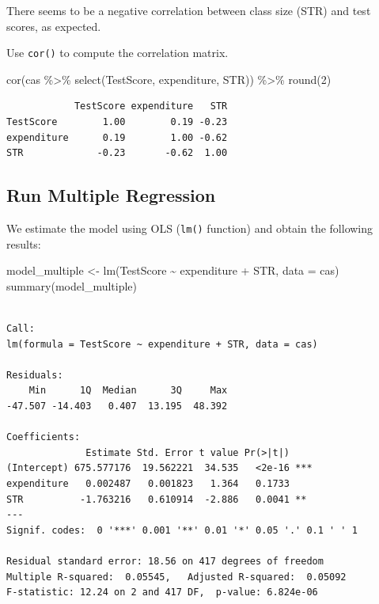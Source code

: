 \documentclass[
  12pt,
  letterpaper,
]{scrbook}
\newenvironment{Shaded}{\begin{snugshade}}{\end{snugshade}}
\newcommand{\AttributeTok}[1]{\textcolor[rgb]{0.40,0.45,0.13}{#1}}
\newcommand{\DecValTok}[1]{\textcolor[rgb]{0.68,0.00,0.00}{#1}}
\newcommand{\FunctionTok}[1]{\textcolor[rgb]{0.28,0.35,0.67}{#1}}
\newcommand{\NormalTok}[1]{\textcolor[rgb]{0.00,0.23,0.31}{#1}}
\newcommand{\OtherTok}[1]{\textcolor[rgb]{0.00,0.23,0.31}{#1}}
\newcommand{\SpecialCharTok}[1]{\textcolor[rgb]{0.37,0.37,0.37}{#1}}
\theoremstyle{definition}
\theoremstyle{plain}
\theoremstyle{remark}
\begin{document}
There seems to be a negative correlation between class size (STR) and
test scores, as expected.

Use \texttt{cor()} to compute the correlation matrix.

\begin{Shaded}
\begin{Highlighting}[]
\FunctionTok{cor}\NormalTok{(cas }\SpecialCharTok{\%\textgreater{}\%} \FunctionTok{select}\NormalTok{(TestScore, expenditure, STR)) }\SpecialCharTok{\%\textgreater{}\%} \FunctionTok{round}\NormalTok{(}\DecValTok{2}\NormalTok{)}
\end{Highlighting}
\end{Shaded}

\begin{verbatim}
            TestScore expenditure   STR
TestScore        1.00        0.19 -0.23
expenditure      0.19        1.00 -0.62
STR             -0.23       -0.62  1.00
\end{verbatim}

\subsection{Run Multiple Regression}\label{run-multiple-regression}

We estimate the model using OLS (\texttt{lm()} function) and obtain the
following results:

\begin{Shaded}
\begin{Highlighting}[]
\NormalTok{model\_multiple }\OtherTok{\textless{}{-}} \FunctionTok{lm}\NormalTok{(TestScore }\SpecialCharTok{\textasciitilde{}}\NormalTok{ expenditure }\SpecialCharTok{+}\NormalTok{ STR, }\AttributeTok{data =}\NormalTok{ cas)}
\FunctionTok{summary}\NormalTok{(model\_multiple)}
\end{Highlighting}
\end{Shaded}

\begin{verbatim}

Call:
lm(formula = TestScore ~ expenditure + STR, data = cas)

Residuals:
    Min      1Q  Median      3Q     Max 
-47.507 -14.403   0.407  13.195  48.392 

Coefficients:
              Estimate Std. Error t value Pr(>|t|)    
(Intercept) 675.577176  19.562221  34.535   <2e-16 ***
expenditure   0.002487   0.001823   1.364   0.1733    
STR          -1.763216   0.610914  -2.886   0.0041 ** 
---
Signif. codes:  0 '***' 0.001 '**' 0.01 '*' 0.05 '.' 0.1 ' ' 1

Residual standard error: 18.56 on 417 degrees of freedom
Multiple R-squared:  0.05545,   Adjusted R-squared:  0.05092 
F-statistic: 12.24 on 2 and 417 DF,  p-value: 6.824e-06
\end{verbatim}
\end{document}
